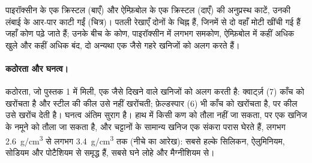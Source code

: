 \begin{omfigure}

{\small पाइरॉक्सीन के एक क्रिस्टल (बाएँ) और ऐम्फ़िबोल के एक क्रिस्टल
(दाएँ) की अनुप्रस्थ काटें, उनकी लंबाई के आर-पार काटी गईं (चित्र)। पतली रेखाएँ
दोनों  के चिह्न हैं, जिनमें से दो वहाँ मोटी खींची गई हैं जहाँ कोण पढ़े जाते हैं;
उनके बीच के कोण, पाइरॉक्सीन में लगभग समकोण, ऐम्फ़िबोल में कहीं अधिक खुले और कहीं अधिक बंद, दो
अन्यथा एक जैसे गहरे खनिजों को अलग करते हैं।}
\end{omfigure}

\paragraph{कठोरता और घनत्व।} कठोरता, जो पुस्तक 1 में मिली, एक जैसे दिखने वाले
खनिजों को अलग करती है: क्वार्ट्ज़ (7) काँच को खरोंचता है और स्टील की कील उसे
नहीं खरोंचती; फ़ेल्डस्पार (6) भी काँच को खरोंचता है, पर कील उसे खरोंच देती है।
घनत्व अंतिम सुराग है। हाथ में किसी कण को तौला नहीं जा सकता, पर एक खनिज के
नमूने को तौला जा सकता है, और चट्टानों के सामान्य खनिज एक संकरा
परास घेरते हैं, लगभग \qty{2.6}{g/cm^3} से लगभग \qty{3.4}{g/cm^3} तक (नीचे का आरेख):
सबसे हल्के सिलिकन, ऐलुमिनियम, सोडियम और पोटैशियम से समृद्ध हैं, सबसे
घने लोहे और मैग्नीशियम से।

